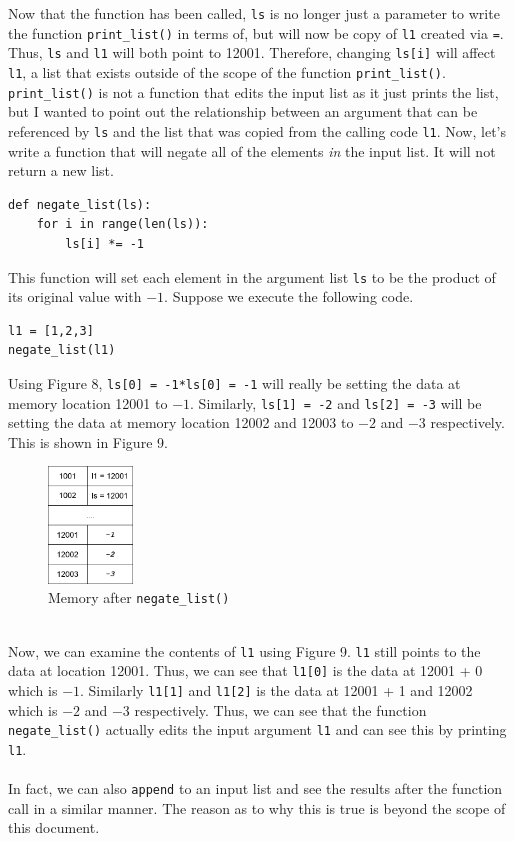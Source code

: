\documentclass{article}
\begin{document}
Now that the function has been called, \texttt{ls} is no longer just a parameter to write the function \texttt{print\_list()} in terms of, but will now be copy of \texttt{l1} created via \texttt{=}. Thus, \texttt{ls} and \texttt{l1} will both point to 12001. Therefore, changing \texttt{ls[i]} will affect \texttt{l1}, a list that exists outside of the scope of the function \texttt{print\_list()}. \texttt{print\_list()} is not a function that edits the input list as it just prints the list, but I wanted to point out the relationship between an argument that can be referenced by \texttt{ls} and the list that was copied from the calling code \texttt{l1}.
\newpage
\noindent Now, let's write a function that will negate all of the elements \textit{in} the input list. It will not return a new list.
\begin{verbatim}
def negate_list(ls):
    for i in range(len(ls)):
        ls[i] *= -1
\end{verbatim}
This function will set each element in the argument list \texttt{ls} to be the product of its original value with $-1$. Suppose we execute the following code.
\begin{verbatim}
l1 = [1,2,3]
negate_list(l1)
\end{verbatim}
Using Figure 8, \texttt{ls[0] = -1*ls[0] = -1} will really be setting the data at memory location 12001 to $-1$. Similarly, \texttt{ls[1] = -2} and \texttt{ls[2] = -3} will be setting the data at memory location 12002 and 12003 to $-2$ and $-3$ respectively. This is shown in Figure 9.
\begin{figure}[hbt]
    \centering
    \includegraphics[width=0.2\textwidth]{pointer_diagram_8.png}
    \caption{Memory after \texttt{negate\_list()}}
    \label{fig:my_label}
\end{figure}\\
Now, we can examine the contents of \texttt{l1} using Figure 9. \texttt{l1} still points to the data at location 12001. Thus, we can see that \texttt{l1[0]} is the data at 12001 + 0 which is $-1$. Similarly \texttt{l1[1]} and \texttt{l1[2]} is the data at 12001 + 1 and 12002 which is $-2$ and $-3$ respectively. Thus, we can see that the function \texttt{negate\_list()} actually edits the input argument \texttt{l1} and can see this by printing \texttt{l1}.\\\\
In fact, we can also \texttt{append} to an input list and see the results after the function call in a similar manner. The reason as to why this is true is beyond the scope of this document.
\end{document}
